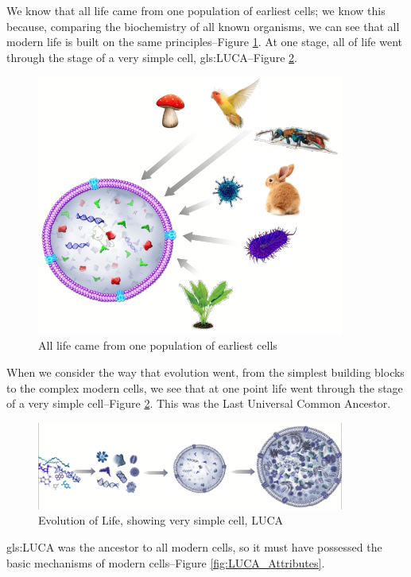 \documentclass[]{article}
\begin{document}
We know that all life came from one population of earliest cells; we know this because, comparing the biochemistry of all known organisms, we can see that all modern life is built on the same principles--Figure \ref{fig:ModernCell}. At one stage, all of life went through the stage of a very simple cell, \gls{gls:LUCA}--Figure \ref{fig:EvolCell}.

\begin{figure}[H]
	\caption{All life came from one population of earliest cells}\label{fig:ModernCell}
	\includegraphics[width=0.9\textwidth]{ModernCell}
\end{figure}

When we consider the way that evolution went, from the simplest building blocks to the complex modern cells, we see that at one point life went through the stage of a very simple cell--Figure \ref{fig:EvolCell}. This was the Last Universal Common Ancestor.
	
\begin{figure}[H]
	\caption{Evolution of Life, showing very simple cell, LUCA}\label{fig:EvolCell}
	\includegraphics[width=0.9\textwidth]{EvolCell}
\end{figure}

\gls{gls:LUCA} was the ancestor to all modern cells, so it must have possessed the basic mechanisms of  modern cells--Figure \ref{fig:LUCA_Attributes}.
\end{document}
